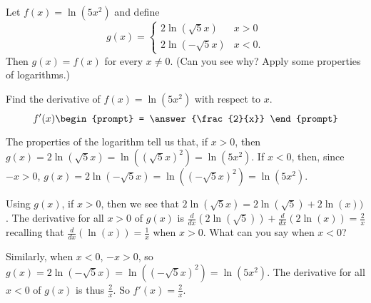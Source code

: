 \documentclass{ximera}
\author{Gregory Hartman \and Matthew Carr}
\begin{document}
\begin{exercise}








Let $f(x)=\ln(5x^2)$ and define 
\[
g(x)=\begin{cases}
2\ln(\sqrt{5}x) & x>0\\
2\ln(-\sqrt{5}x) & x<0.
\end{cases}
\]
Then $g(x)=f(x)$ for every $x\ne0$. (Can you see why? Apply some properties of logarithms.)

Find the derivative of $f(x)=\ln(5x^2)$ with respect to $x$. 
\[
f'(x)
\begin{prompt} 
= \answer{\frac{2}{x}}
\end{prompt}
\]
\begin{hint}
The properties of the logarithm tell us that, if $x>0$, then $g(x)=2\ln(\sqrt{5}x)=\ln(\left(\sqrt{5}x\right)^2)=\ln(5x^2)$. If $x<0$, then, since $-x>0$, $g(x)=2\ln(-\sqrt{5}x)=\ln(\left(-\sqrt{5}x\right)^2)=\ln(5x^2)$.  
\end{hint}
\begin{hint}
Using $g(x)$, if $x>0$, then we see that $2\ln(\sqrt{5}x)=2\ln(\sqrt{5})+2\ln(x))$. The derivative for all $x>0$ of $g(x)$ is $\frac{d}{dx}\left(2\ln(\sqrt{5})\right)+\frac{d}{dx}\left(2\ln(x)\right)=\frac{2}{x}$ recalling that $\frac{d}{dx}\left(\ln(x)\right)=\frac{1}{x}$ when $x>0$. What can you say when $x<0$?
\end{hint}
\begin{hint}
Similarly, when $x<0$, $-x>0$, so $g(x)=2\ln(-\sqrt{5}x)=\ln(\left(-\sqrt{5}x\right)^2)=\ln(5x^2)$. The derivative for all $x<0$ of $g(x)$ is thus $\frac{2}{x}$. So $f'(x)=\frac{2}{x}$.
\end{hint}
\end{exercise}
\end{document}
